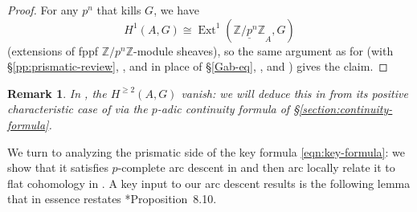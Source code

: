 \documentclass[11pt, reqno]{amsart}
\newcommand{\bA}{\mathbb{A}}
\newcommand{\bM}{\mathbb{M}}
\newcommand{\bZ}{\mathbb{Z}}
\DeclareMathOperator{\Ext}{Ext}		%
\DeclareMathOperator{\Hom}{Hom}		%
\newcommand{\Frob}{\mathrm{Frob}}			%
\newcommand{\Inf}{\mathrm{inf}}		%
\newcommand{\ra}{\rightarrow}
\newcommand{\ba}{\begin{aligned}}
\newcommand{\ea}{\end{aligned}}
\newcommand{\bpf}{\begin{proof}}
\newcommand{\epf}{\end{proof}}
\newcommand{\brem}{\begin{rem}}
\newcommand{\erem}{\end{rem}}
\numberwithin{equation}{numberingbase}
\theoremstyle{thms}
\theoremstyle{claims}
\theoremstyle{defs}
\newtheorem{rem}[numberingbase]{Remark}
\theoremstyle{thms}
\theoremstyle{defs}
\theoremstyle{subsection-tweak}
\theoremstyle{subsection-tweak}
\newcommand{\bb}{\boldsymbol}		%
\begin{document}
\bpf
For any $p^n$ that kills $G$, we have 
\[
H^1(A, G) \cong \Ext^1(\underline{\bZ/p^n\bZ}_A, G)
\]
(extensions of fppf $\bZ/p^n\bZ$-module sheaves), so the same argument as for  (with \S\ref{pp:prismatic-review}, , and  in place of \S\ref{Gab-eq}, , and ) gives the claim.
\epf






\brem
In , the $H^{\ge 2}(A, G)$ vanish: we will deduce this in  from its positive characteristic case of  via the $p$-adic continuity formula of \S\ref{section:continuity-formula}.
\erem




We turn to analyzing the prismatic side of the key formula \eqref{eqn:key-formula}: we show that it satisfies $p$-complete arc descent in  and then arc locally relate it to flat cohomology in . A key input to our %
arc descent results is the following lemma that in essence restates \cite{BS19}*{Proposition~8.10}.
\end{document}
